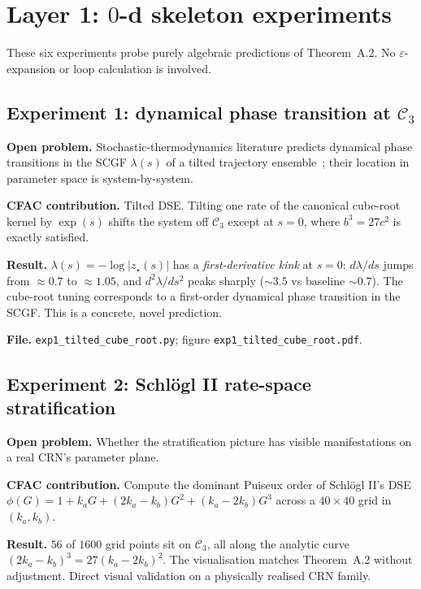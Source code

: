 \documentclass[11pt,a4paper]{article}
\theoremstyle{plain}
\newcommand{\Ck}{\mathcal{C}}
\begin{document}
\section{Layer 1: $0$-d skeleton experiments}
\label{sec:layer1}

These six experiments probe purely algebraic predictions of Theorem~A.2.
No $\varepsilon$-expansion or loop calculation is involved.

\subsection*{Experiment 1: dynamical phase transition at $\Ck_{3}$}

\textbf{Open problem.}  Stochastic-thermodynamics literature predicts
dynamical phase transitions in the SCGF $\lambda(s)$ of a tilted
trajectory ensemble~\citep{Touchette2009,Garrahan2007}; their location in
parameter space is system-by-system.

\textbf{CFAC contribution.}  Tilted DSE.  Tilting one rate of the
canonical cube-root kernel by $\exp(s)$ shifts the system off $\Ck_{3}$
except at $s=0$, where $b^{3} = 27c^{2}$ is exactly satisfied.

\textbf{Result.}  $\lambda(s) = -\log|z_{\star}(s)|$ has a
\emph{first-derivative kink} at $s=0$: $d\lambda/ds$ jumps from $\approx 0.7$
to $\approx 1.05$, and $d^{2}\lambda/ds^{2}$ peaks sharply ($\sim 3.5$ vs
baseline $\sim 0.7$).  The cube-root tuning corresponds to a first-order
dynamical phase transition in the SCGF.  This is a concrete, novel
prediction.

\textbf{File.}  \texttt{exp1\_tilted\_cube\_root.py};
figure \texttt{exp1\_tilted\_cube\_root.pdf}.

\subsection*{Experiment 2: Schl\"ogl II rate-space stratification}

\textbf{Open problem.}  Whether the stratification picture has visible
manifestations on a real CRN's parameter plane.

\textbf{CFAC contribution.}  Compute the dominant Puiseux order of
Schl\"ogl II's DSE
$\phi(G) = 1 + k_{a}G + (2k_{a}-k_{b})G^{2} + (k_{a}-2k_{b})G^{3}$
across a $40\times 40$ grid in $(k_{a}, k_{b})$.

\textbf{Result.}  $56$ of $1600$ grid points sit on $\Ck_{3}$, all along
the analytic curve $(2k_{a}-k_{b})^{3} = 27(k_{a}-2k_{b})^{2}$.  The
visualisation matches Theorem~A.2 without adjustment.  Direct visual
validation on a physically realised CRN family.
\end{document}
